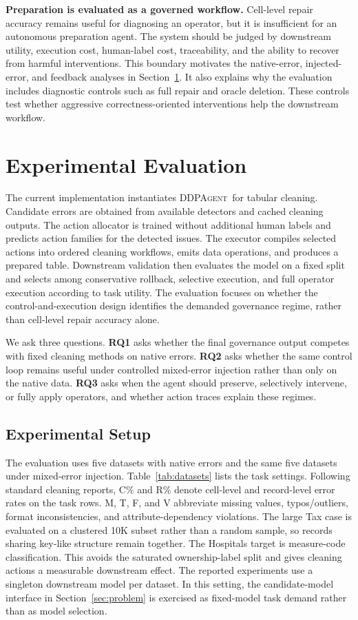 \documentclass[sigconf, nonacm]{acmart}
\newcommand{\sys}{\textsc{DDPAgent}\xspace}
\begin{document}
\textbf{Preparation is evaluated as a governed workflow.}
Cell-level repair accuracy remains useful for diagnosing an operator, but it is insufficient for an autonomous preparation agent. The system should be judged by downstream utility, execution cost, human-label cost, traceability, and the ability to recover from harmful interventions. This boundary motivates the native-error, injected-error, and feedback analyses in Section~\ref{sec:evaluation}. It also explains why the evaluation includes diagnostic controls such as full repair and oracle deletion. These controls test whether aggressive correctness-oriented interventions help the downstream workflow.

\section{Experimental Evaluation}
\label{sec:evaluation}

The current implementation instantiates \sys\ for tabular cleaning. Candidate errors are obtained from available detectors and cached cleaning outputs. The action allocator is trained without additional human labels and predicts action families for the detected issues. The executor compiles selected actions into ordered cleaning workflows, emits data operations, and produces a prepared table. Downstream validation then evaluates the model on a fixed split and selects among conservative rollback, selective execution, and full operator execution according to task utility. The evaluation focuses on whether the control-and-execution design identifies the demanded governance regime, rather than cell-level repair accuracy alone.

We ask three questions. \textbf{RQ1} asks whether the final governance output competes with fixed cleaning methods on native errors. \textbf{RQ2} asks whether the same control loop remains useful under controlled mixed-error injection rather than only on the native data. \textbf{RQ3} asks when the agent should preserve, selectively intervene, or fully apply operators, and whether action traces explain these regimes.

\subsection{Experimental Setup}

The evaluation uses five datasets with native errors and the same five datasets under mixed-error injection. Table~\ref{tab:datasets} lists the task settings. Following standard cleaning reports, C\% and R\% denote cell-level and record-level error rates on the task rows. M, T, F, and V abbreviate missing values, typos/outliers, format inconsistencies, and attribute-dependency violations. The large Tax case is evaluated on a clustered 10K subset rather than a random sample, so records sharing key-like structure remain together. The Hospitals target is measure-code classification. This avoids the saturated ownership-label split and gives cleaning actions a measurable downstream effect. The reported experiments use a singleton downstream model per dataset. In this setting, the candidate-model interface in Section~\ref{sec:problem} is exercised as fixed-model task demand rather than as model selection.
\end{document}
